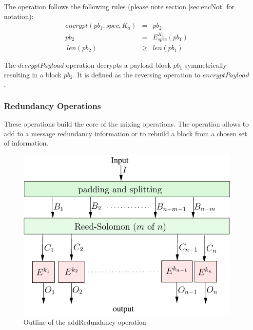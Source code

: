 \documentclass[10pt,journal,compsoc,twocolumn,twoside]{IEEEtran}
\let\MYoriglatexcaption\caption
\renewcommand{\caption}[2][\relax]{\MYoriglatexcaption[#2]{#2}}
\begin{document}
The operation follows the following rules (please note section \ref{sec:encNot} for notation):
\begin{eqnarray}
encrypt(pb_1, spec, K_a) & = & pb_2 \\
pb_2 & = & E_{spec}^{K_a}\left( pb_1 \right)\\\
len(pb_2) & \geq & len(pb_1)
\end{eqnarray}


The $decryptPayload$ operation decrypts a payload block $pb_1$ symmetrically resulting in a block $pb_2$. It is defined as the reversing operation to $encryptPayload$. 

%
%

\subsubsection{Redundancy Operations}
These operations build the core of the mixing operations. The operation allows to add to a message redundancy information or to rebuild a block from a chosen set of information. 

\begin{figure}[ht]\centering
	\includegraphics[width=0.5\columnwidth]{addRedundancyOp}
	\caption{Outline of the addRedundancy operation}
	\label{fig:addRedundancyOperation}
\end{figure}
\end{document}
